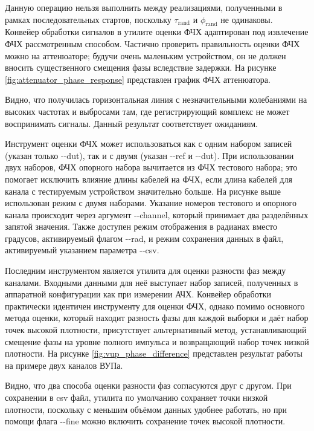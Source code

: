 \documentclass{report}
\begin{document}
Данную операцию нельзя выполнить между реализациями, полученными в рамках последовательных стартов, поскольку  $\tau_\text{rand}$ и $\phi_\text{rand}$ не одинаковы. Конвейер обработки сигналов в утилите оценки ФЧХ адаптирован под извлечение ФЧХ рассмотренным способом. Частично проверить правильность оценки ФЧХ можно на аттенюаторе; будучи очень маленьким устройством, он не должен вносить существенного смещения фазы вследствие задержки. На рисунке \ref{fig:attenuator_phase_response} представлен график ФЧХ аттенюатора.


Видно, что получилась горизонтальная линия с незначительными колебаниями на высоких частотах и выбросами там, где регистрирующий комплекс не может воспринимать сигналы. Данный результат соответствует ожиданиям.

Инструмент оценки ФЧХ может использоваться как с одним набором записей (указан только -{}-dut), так и с двумя (указан -{}-ref и -{}-dut). При использовании двух наборов, ФЧХ опорного набора вычитается из ФЧХ тестового набора; это помогает исключить влияние длины кабелей на ФЧХ, если длина кабелей для канала с тестируемым устройством значительно больше. На рисунке выше использован режим с двумя наборами. Указание номеров тестового и опорного канала происходит через аргумент -{}-channel, который принимает два разделённых запятой значения. Также доступен режим отображения в радианах вместо градусов, активируемый флагом -{}-rad, и режим сохранения данных в файл, активируемый указанием параметра -{}-csv.

Последним инструментом является утилита для оценки разности фаз между каналами. Входными данными для неё выступает набор записей, полученных в аппаратной конфигурации как при измерении АЧХ. Конвейер обработки практически идентичен инструменту для оценки ФЧХ, однако помимо основного метода оценки, который находит разность фазы для каждой выборки и даёт набор точек высокой плотности, присутствует альтернативный метод, устанавливающий смещение фазы на уровне полного импульса и возвращающий набор точек низкой плотности. На рисунке \ref{fig:vup_phase_difference} представлен результат работы на примере двух каналов ВУПа.


Видно, что два способа оценки разности фаз согласуются друг с другом. При сохранении в csv файл, утилита по умолчанию сохраняет точки низкой плотности, поскольку с меньшим объёмом данных удобнее работать, но при помощи флага -{}-fine можно включить сохранение точек высокой плотности.
\end{document}
